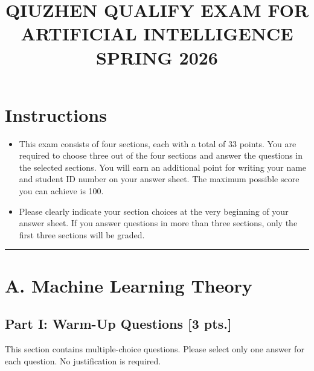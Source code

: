 \documentclass[11pt,a4paper]{article}
\title{\textbf{QIUZHEN QUALIFY EXAM FOR ARTIFICIAL INTELLIGENCE}\\[0.5em]\Large SPRING 2026}
\date{}
\author{}
\begin{document}
\maketitle
\vspace{-3em}

\section*{Instructions}
\begin{itemize}
    \item This exam consists of four sections, each with a total of 33 points. You are required to choose three out of the four sections and answer the questions in the selected sections. You will earn an additional point for writing your name and student ID number on your answer sheet. The maximum possible score you can achieve is 100.
    \item Please clearly indicate your section choices at the very beginning of your answer sheet. If you answer questions in more than three sections, only the first three sections will be graded.
\end{itemize}

\noindent\rule{\linewidth}{0.4pt}

\section*{A. Machine Learning Theory}

\subsection*{Part I: Warm-Up Questions [3 pts.]}
This section contains multiple-choice questions. Please select only one answer for each question. No justification is required.
\end{document}
